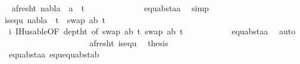 \begin{isabellebody}
\ \isamarkupfalse%
\ a{\isacharunderscore}{\kern0pt}fresh{\isacharunderscore}{\kern0pt}t{}{\isacharcolon}{\kern0pt}\ {\isachardoublequoteopen}nabla\ {\isasymturnstile}\ a\ {\isasymsharp}\ t{}{\isacharprime}{\kern0pt}{\isachardoublequoteclose}\isanewline
\ \ \ \ \ \ \ \ \ \ \ \isamarkupfalse%
\ {}{\isacharparenleft}{\kern0pt}{}{\isacharcomma}{\kern0pt}{}{\isacharparenright}{\kern0pt}\ equ{\isacharunderscore}{\kern0pt}abst{\isacharunderscore}{\kern0pt}aa{\isacharparenleft}{\kern0pt}{}{\isacharparenright}{\kern0pt}\ \isamarkupfalse%
\ simp\isanewline
\isanewline
\ \ \ \ \ \ \ \ \ \isamarkupfalse%
\ is{\isacharunderscore}{\kern0pt}equ{\isacharcolon}{\kern0pt}\ {\isachardoublequoteopen}nabla\ {\isasymturnstile}\ t{}{\isacharprime}{\kern0pt}\ {\isasymapprox}\ swap\ {\isacharbrackleft}{\kern0pt}{\isacharparenleft}{\kern0pt}a{\isacharcomma}{\kern0pt}b{\isacharparenright}{\kern0pt}{\isacharbrackright}{\kern0pt}\ t{}{\isacharprime}{\kern0pt}{\isachardoublequoteclose}\isanewline
\ \ \ \ \ \ \ \ \ \ \ \isamarkupfalse%
\ {}\ i\ IH{\isacharunderscore}{\kern0pt}usable{\isacharbrackleft}{\kern0pt}OF\ deptht{}{\isacharcomma}{\kern0pt}\ of\ {\isacartoucheopen}swap\ {\isacharbrackleft}{\kern0pt}{\isacharparenleft}{\kern0pt}a{\isacharcomma}{\kern0pt}b{\isacharparenright}{\kern0pt}{\isacharbrackright}{\kern0pt}\ t{}{\isacharprime}{\kern0pt}{\isacartoucheclose}\ {\isacartoucheopen}swap\ {\isacharbrackleft}{\kern0pt}{\isacharparenleft}{\kern0pt}a{\isacharcomma}{\kern0pt}b{\isacharparenright}{\kern0pt}{\isacharbrackright}{\kern0pt}\ t{}{\isacharprime}{\kern0pt}{\isacartoucheclose}{\isacharbrackright}{\kern0pt}\isanewline
\ \ \ \ \ \ \ \ \ \ \ equ{\isacharunderscore}{\kern0pt}abst{\isacharunderscore}{\kern0pt}aa{\isacharparenleft}{\kern0pt}{}{\isacharparenright}{\kern0pt}\ \isamarkupfalse%
\ auto\isanewline
\ \ \ \ \ \ \ \ \ \ \isanewline
\ \ \ \ \ \ \ \ \ \isamarkupfalse%
\ a{\isacharunderscore}{\kern0pt}fresh{\isacharunderscore}{\kern0pt}t{}\ is{\isacharunderscore}{\kern0pt}equ\ \isamarkupfalse%
\ {\isacharquery}{\kern0pt}thesis\isanewline
\ \ \ \ \ \ \ \ \ \ \ \isamarkupfalse%
\ {}\ equ{\isacharunderscore}{\kern0pt}abst{\isacharunderscore}{\kern0pt}aa{\isacharparenleft}{\kern0pt}{}{\isacharcomma}{\kern0pt}{}{\isacharparenright}{\kern0pt}\ equ{\isachardot}{\kern0pt}equ{\isacharunderscore}{\kern0pt}abst{\isacharunderscore}{\kern0pt}ab\ \isamarkupfalse%

\end{isabellebody}
